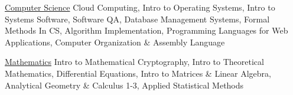 
\vspace{-1.5mm}
\begin{cvskills}

  \vspace{1mm}

  \cvskill
    {\href{https://cs.pitt.edu/}{Computer Science}} %
    {Cloud Computing, Intro to Operating Systems, Intro to Systems Software, Software QA,\newline \vspace{0.5mm} Database Management Systems, Formal Methods In CS, Algorithm Implementation,\newline \vspace{0.5mm} Programming Languages for Web Applications, Computer Organization \& Assembly Language} %

   \cvskill
    {\href{https://www.mathematics.pitt.edu/}{Mathematics}} %
	{Intro to Mathematical Cryptography, Intro to Theoretical Mathematics, Differential Equations,\newline \vspace{0.5mm} Intro to Matrices \& Linear Algebra, Analytical Geometry \& Calculus 1-3, Applied Statistical Methods} %


\end{cvskills}
\vspace{-0.5mm}